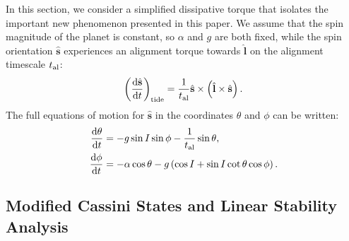 \documentclass[
        fleqn,
        usenatbib,
    ]{mnras}
\newcommand*{\rd}[2]{\frac{\mathrm{d}#1}{\mathrm{d}#2}}
\newcommand*{\p}[1]{\left(#1\right)}
\newcommand*{\uv}[1]{\hat{\boldsymbol{\mathbf{#1}}}}
\begin{document}
In this section, we consider a simplified dissipative torque that isolates the
important new phenomenon presented in this paper. We assume that the spin
magnitude of the planet is constant, so $\alpha$ and $g$ are both fixed, while
the spin orientation $\uv{s}$ experiences an alignment torque towards $\uv{l}$
on the alignment timescale $t_{\rm al}$:
\begin{equation}
    \p{\rd{\uv{s}}{t}}_{\rm tide}
        = \frac{1}{t_{\rm al}} \uv{s} \times \p{\uv{l} \times \uv{s}}.
        \label{eq:dsdt_tide_toy}
\end{equation}
The full equations of motion for $\uv{s}$ in the coordinates $\theta$ and $\phi$
can be written:
\begin{align}
    \rd{\theta}{t} &= -g\sin I \sin \phi - \frac{1}{t_{\rm al}} \sin \theta,
        \label{eq:dqdt_toy}\\
    \rd{\phi}{t} &= -\alpha \cos\theta
        - g\p{\cos I + \sin I \cot \theta \cos \phi}.\label{eq:dfdt_toy}
\end{align}

\subsection{Modified Cassini States and Linear Stability
Analysis}\label{ss:tidal_equils}
\end{document}
